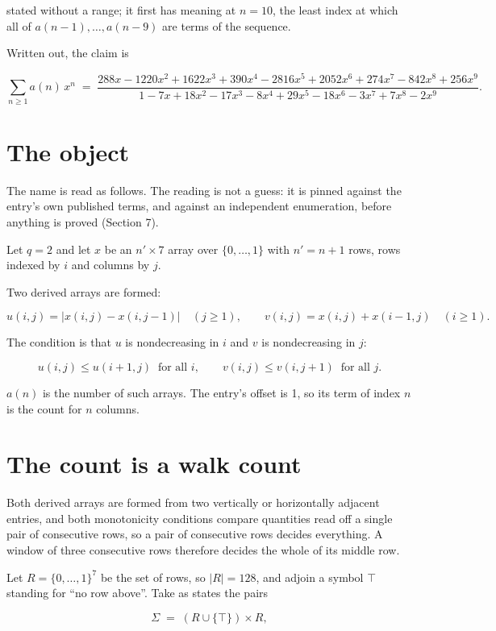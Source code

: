 \documentclass[11pt]{article}
\theoremstyle{definition}
\begin{document}
stated without a range; it first has meaning at $n = 10$, the least index at which all of $a(n-1),\dots,a(n-9)$ are terms of the sequence.

Written out, the claim is

\[\sum_{n \ge 1} a(n)\,x^n \;=\; \frac{288x - 1220x^{2} + 1622x^{3} + 390x^{4} - 2816x^{5} + 2052x^{6} + 274x^{7} - 842x^{8} + 256x^{9}}{1 - 7x + 18x^{2} - 17x^{3} - 8x^{4} + 29x^{5} - 18x^{6} - 3x^{7} + 7x^{8} - 2x^{9}}.\]

\section{The object}

The name is read as follows. The reading is not a guess: it is pinned against the entry's own published terms, and against an independent enumeration, before anything is proved (Section 7).

Let $q = 2$ and let $x$ be an $n' \times 7$ array over $\{0,\dots,1\}$ with $n' = n + 1$ rows, rows indexed by $i$ and columns by $j$.

Two derived arrays are formed:

\[u(i,j) = \lvert x(i,j) - x(i,j{-}1)\rvert\quad (j \ge 1), \qquad v(i,j) = x(i,j) + x(i{-}1,j)\quad (i \ge 1).\]

The condition is that $u$ is nondecreasing in $i$ and $v$ is nondecreasing in $j$:

\[u(i,j) \le u(i{+}1,j) \ \text{ for all } i, \qquad v(i,j) \le v(i,j{+}1) \ \text{ for all } j.\]

$a(n)$ is the number of such arrays. The entry's offset is 1, so its term of index $n$ is the count for $n$ columns.

\section{The count is a walk count}

Both derived arrays are formed from two vertically or horizontally adjacent entries, and both monotonicity conditions compare quantities read off a single pair of consecutive rows, so a pair of consecutive rows decides everything. A window of three consecutive rows therefore decides the whole of its middle row.

Let $R = \{0,\dots,1\}^{7}$ be the set of rows, so $|R| = 128$, and adjoin a symbol $\top$ standing for ``no row above''. Take as states the pairs

\[\Sigma \;=\; (R \cup \{\top\}) \times R,\]
\end{document}
